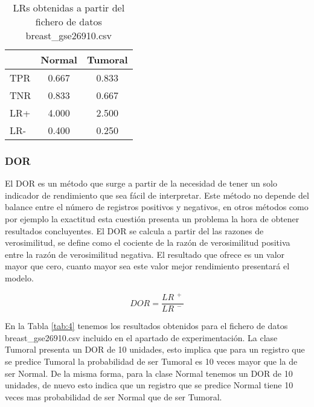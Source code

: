 \begin{table}[ht]
    \centering
    \begin{tabular}[t]{lcc}
            & \hspace{20pt}Normal\hspace{20pt} & Tumoral \\\hline
        TPR & 0.667                            & 0.833   \\\hline
        TNR & 0.833                            & 0.667   \\\hline
        LR+ & 4.000                            & 2.500   \\\hline
        LR- & 0.400                            & 0.250   \\\hline
    \end{tabular}
    \caption{LRs obtenidas a partir del fichero de datos breast\_gse26910.csv}
    \label{tab:3}
\end{table}


\subsubsection{DOR}

El DOR es un método que surge a partir de la necesidad de tener un solo indicador de rendimiento que sea fácil de interpretar. Este método no depende del balance entre el número de registros positivos y negativos, en otros métodos como por ejemplo la exactitud esta cuestión presenta un problema la hora de obtener resultados concluyentes. El DOR se calcula a partir del las razones de verosimilitud, se define como el cociente de la razón de verosimilitud positiva entre la razón de verosimilitud negativa. El resultado que ofrece es un valor mayor que cero, cuanto mayor sea este valor mejor rendimiento presentará el modelo.

\bigbreak

\begin{equation}\tag*{}
    DOR = \frac{LR^{\phantom{.}+}}{LR^{\phantom{.}-}}
\end{equation}

\bigbreak

En la Tabla \ref{tab:4} tenemos los resultados obtenidos para el fichero de datos breast\_gse26910.csv incluido en el apartado de experimentación. La clase Tumoral presenta un DOR de 10 unidades, esto implica que para un registro que se predice Tumoral la probabilidad de ser Tumoral es 10 veces mayor que la de ser Normal. De la misma forma, para la clase Normal tenemos un DOR de 10 unidades, de nuevo esto indica que un registro que se predice Normal tiene 10 veces mas probabilidad de ser Normal que de ser Tumoral.

